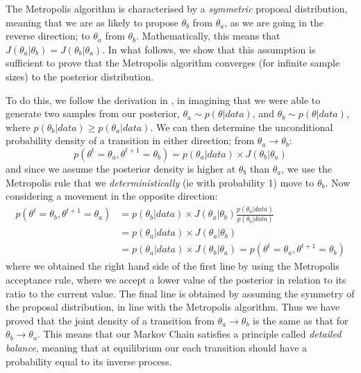\documentclass[11pt,fullpage]{book}
\begin{document}
The Metropolis algorithm is characterised by a \textit{symmetric} proposal distribution, meaning that we are as likely to propose $\theta_b$ from $\theta_a$, as we are going in the reverse direction; to $\theta_a$ from $\theta_b$. Mathematically, this means that $J(\theta_a|\theta_b)=J(\theta_b|\theta_a)$. In what follows, we show that this assumption is sufficient to prove that the Metropolis algorithm converges (for infinite sample sizes) to the posterior distribution.

To do this, we follow the derivation in \cite{gelman2013bayesian}, in imagining that we were able to generate two samples from our posterior, $\theta_a\sim p(\theta|data)$, and $\theta_b\sim p(\theta|data)$, where $p(\theta_b|data)\geq p(\theta_a|data)$. We can then determine the unconditional probability density of a transition in either direction; from $\theta_a\rightarrow\theta_b$:
%
\begin{equation}
p(\theta^{t}=\theta_a,\theta^{t+1}=\theta_b) = p(\theta_a|data)\times J(\theta_b|\theta_a)
\end{equation}
%
and since we assume the posterior density is higher at $\theta_b$ than $\theta_a$, we use the Metropolis rule that we \textit{deterministically} (ie with probability 1) move to $\theta_b$. Now considering a movement in the opposite direction:
%
\begin{align}
p(\theta^{t} = \theta_b,\theta^{t+1}=\theta_a) &= p(\theta_b|data) \times J(\theta_a|\theta_b) \frac{p(\theta_a|data)}{p(\theta_b|data)}\\
&= p(\theta_a|data)\times J(\theta_a|\theta_b)\\
&= p(\theta_a|data)\times J(\theta_b|\theta_a)=p(\theta^{t}=\theta_a,\theta^{t+1}=\theta_b)
\end{align}
%
where we obtained the right hand side of the first line by using the Metropolis acceptance rule, where we accept a lower value of the posterior in relation to its ratio to the current value. The final line is obtained by assuming the symmetry of the proposal distribution, in line with the Metropolis algorithm. Thus we have proved that the joint density of a transition from $\theta_a\rightarrow\theta_b$ is the same as that for $\theta_b\rightarrow\theta_a$. This means that our Markov Chain satisfies a principle called \textit{detailed balance}, meaning that at equilibrium our each transition should have a probability equal to its inverse process. 
\end{document}
